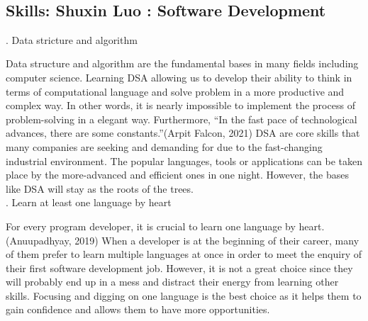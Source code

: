 \documentclass[a4paper, 11pt]{report}
\begin{document}
\\

\subsection{Skills: Shuxin Luo : Software Development}

. Data stricture and algorithm

\noindent Data structure and algorithm are the fundamental bases in many fields including computer science. Learning DSA allowing us to develop their ability to think in terms of computational language and solve problem in a more productive and complex way. In other words, it is nearly impossible to implement the process of problem-solving in a elegant way. Furthermore, “In the fast pace of technological advances, there are some constants.”(Arpit Falcon, 2021) DSA are core skills that many companies are seeking and demanding for due to the fast-changing industrial environment. The popular languages, tools or applications can be taken place by the more-advanced and efficient ones in one night. However, the bases like DSA will stay as the roots of the trees.\\

. Learn at least one language by heart

\noindent For every program developer, it is crucial to learn one language by heart.(Anuupadhyay, 2019) When a developer is at the beginning of their career, many of them prefer to learn multiple languages at once in order to meet the enquiry of their first software development job. However, it is not a great choice since they will probably end up in a mess and distract their energy from learning other skills. Focusing and digging on one language is the best choice as it helps them to gain confidence and allows them to have more opportunities.\\
\end{document}
